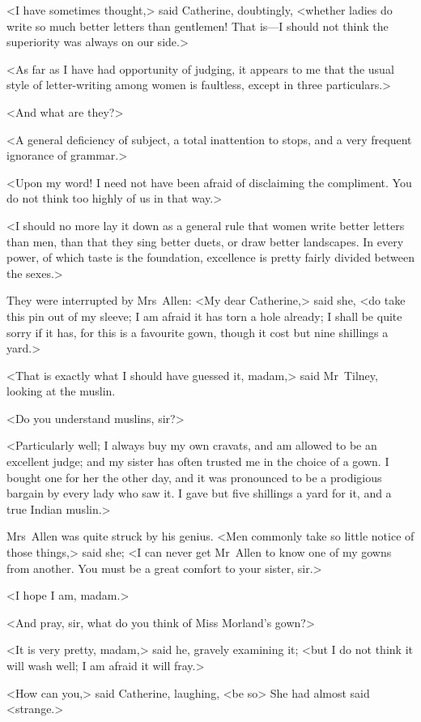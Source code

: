  <I have sometimes thought,> said Catherine, doubtingly, <whether ladies do write so much better letters than gentlemen! That is—I should not think the superiority was always on our side.> 

 <As far as I have had opportunity of judging, it appears to me that the usual style of letter-writing among women is faultless, except in three particulars.> 

 <And what are they?> 

 <A general deficiency of subject, a total inattention to stops, and a very frequent ignorance of grammar.> 

 <Upon my word! I need not have been afraid of disclaiming the compliment. You do not think too highly of us in that way.> 

 <I should no more lay it down as a general rule that women write better letters than men, than that they sing better duets, or draw better landscapes. In every power, of which taste is the foundation, excellence is pretty fairly divided between the sexes.> 

 They were interrupted by Mrs~Allen: <My dear Catherine,> said she, <do take this pin out of my sleeve; I am afraid it has torn a hole already; I shall be quite sorry if it has, for this is a favourite gown, though it cost but nine shillings a yard.> 

 <That is exactly what I should have guessed it, madam,> said Mr~Tilney, looking at the muslin. 

 <Do you understand muslins, sir?> 

 <Particularly well; I always buy my own cravats, and am allowed to be an excellent judge; and my sister has often trusted me in the choice of a gown. I bought one for her the other day, and it was pronounced to be a prodigious bargain by every lady who saw it. I gave but five shillings a yard for it, and a true Indian muslin.> 

 Mrs~Allen was quite struck by his genius. <Men commonly take so little notice of those things,> said she; <I can never get Mr~Allen to know one of my gowns from another. You must be a great comfort to your sister, sir.> 

 <I hope I am, madam.> 

 <And pray, sir, what do you think of Miss Morland's gown?> 

 <It is very pretty, madam,> said he, gravely examining it; <but I do not think it will wash well; I am afraid it will fray.> 

 <How can you,> said Catherine, laughing, <be so\longdash> She had almost said <strange.> 

